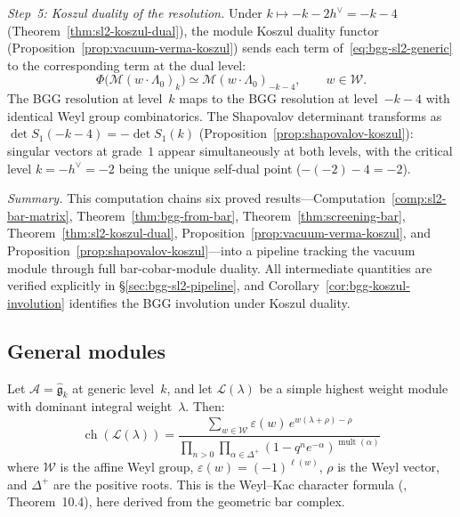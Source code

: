 \begin{computation}
\emph{Step~5: Koszul duality of the resolution.}
Under $k \mapsto -k - 2h^\vee = -k-4$
(Theorem~\ref{thm:sl2-koszul-dual}), the module Koszul duality
functor (Proposition~\ref{prop:vacuum-verma-koszul}) sends each
term of~\eqref{eq:bgg-sl2-generic} to the corresponding term at
the dual level:
\[
\Phi\bigl(\mathcal{M}(w \cdot \Lambda_0)_k\bigr)
\simeq \mathcal{M}(w \cdot \Lambda_0)_{-k-4},
\qquad w \in \mathcal{W}.
\]
The BGG resolution at level~$k$ maps to the BGG resolution at
level~$-k-4$ with identical Weyl group combinatorics.
The Shapovalov determinant transforms as
$\det S_1(-k-4) = -\det S_1(k)$
(Proposition~\ref{prop:shapovalov-koszul}): singular vectors
at grade~$1$ appear simultaneously at both levels,
with the critical level $k = -h^\vee = -2$ being the unique
self-dual point ($-(-2)-4 = -2$).

\emph{Summary.}
This computation chains six proved results---Computation~\ref{comp:sl2-bar-matrix},
Theorem~\ref{thm:bgg-from-bar}, Theorem~\ref{thm:screening-bar},
Theorem~\ref{thm:sl2-koszul-dual},
Proposition~\ref{prop:vacuum-verma-koszul},
and Proposition~\ref{prop:shapovalov-koszul}---into a pipeline tracking
the vacuum module through full bar-cobar-module duality.
All intermediate quantities are verified explicitly in
\S\ref{sec:bgg-sl2-pipeline}, and
Corollary~\ref{cor:bgg-koszul-involution} identifies the BGG
involution under Koszul duality.
\end{computation}

\subsection{General modules}

\begin{theorem}
\label{thm:weyl-kac-geometric}
Let $\mathcal{A} = \widehat{\mathfrak{g}}_k$ at generic level~$k$,
and let $\mathcal{L}(\lambda)$ be a simple highest weight module
with dominant integral weight~$\lambda$.  Then:
\[
\operatorname{ch}(\mathcal{L}(\lambda))
= \frac{\sum_{w \in \mathcal{W}} \varepsilon(w)\,
   e^{w(\lambda + \rho) - \rho}}
  {\prod_{n > 0} \prod_{\alpha \in \Delta^+}
   (1 - q^n e^{-\alpha})^{\operatorname{mult}(\alpha)}}
\]
where $\mathcal{W}$ is the affine Weyl group,
$\varepsilon(w) = (-1)^{\ell(w)}$, $\rho$ is the Weyl vector,
and $\Delta^+$ are the positive roots.  This is the Weyl--Kac
character formula \textup{(\cite{Kac}, Theorem~10.4)}, here
derived from the geometric bar complex.
\end{theorem}


